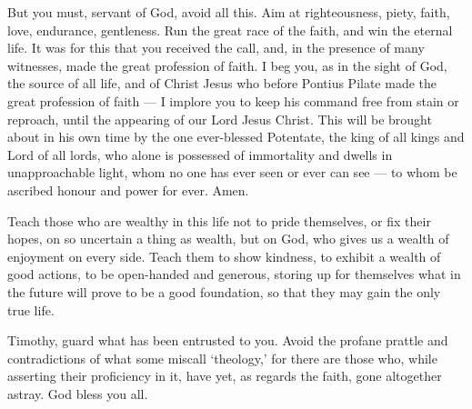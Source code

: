  But you must, servant of God, avoid all this. Aim at
righteousness, piety, faith, love, endurance, gentleness. 
Run the great race of the faith, and win the eternal life. It was for
this that you received the call, and, in the presence of many witnesses,
made the great profession of faith.  I beg you, as in the
sight of God, the source of all life, and of Christ Jesus who before
Pontius Pilate made the great profession of faith ---  I
implore you to keep his command free from stain or reproach, until the
appearing of our Lord Jesus Christ.  This will be brought
about in his own time by the one ever-blessed Potentate, the king of all
kings and Lord of all lords,  who alone is possessed of
immortality and dwells in unapproachable light, whom no one has ever
seen or ever can see --- to whom be ascribed honour and power for ever.
Amen.

 Teach those who are wealthy in this life not to pride
themselves, or fix their hopes, on so uncertain a thing as wealth, but
on God, who gives us a wealth of enjoyment on every side. 
Teach them to show kindness, to exhibit a wealth of good actions, to be
open-handed and generous,  storing up for themselves what
in the future will prove to be a good foundation, so that they may gain
the only true life.

 Timothy, guard what has been entrusted to you. Avoid the
profane prattle and contradictions of what some miscall `theology,'
 for there are those who, while asserting their proficiency
in it, have yet, as regards the faith, gone altogether astray. God bless
you all.
